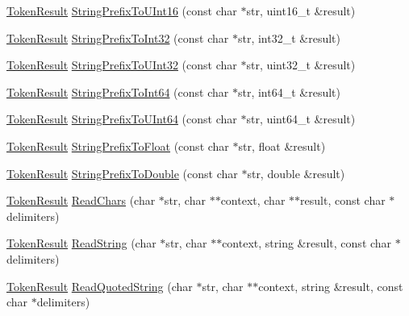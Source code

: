 \begin{DoxyCompactItemize}
\item 
\hyperlink{namespacemage_a2178ba2411db5912f41b2e7698c2037d}{Token\+Result} \hyperlink{namespacemage_a59f623733dd4ad636de4cea46467da7d}{String\+Prefix\+To\+U\+Int16} (const char $\ast$str, uint16\+\_\+t \&result)
\item 
\hyperlink{namespacemage_a2178ba2411db5912f41b2e7698c2037d}{Token\+Result} \hyperlink{namespacemage_a6fbea19380a6886e4e84f45d86d3379f}{String\+Prefix\+To\+Int32} (const char $\ast$str, int32\+\_\+t \&result)
\item 
\hyperlink{namespacemage_a2178ba2411db5912f41b2e7698c2037d}{Token\+Result} \hyperlink{namespacemage_a7843190a71ad080e1ae5e5f1ca518db9}{String\+Prefix\+To\+U\+Int32} (const char $\ast$str, uint32\+\_\+t \&result)
\item 
\hyperlink{namespacemage_a2178ba2411db5912f41b2e7698c2037d}{Token\+Result} \hyperlink{namespacemage_a8fda775d2c9f4f0a465d566540e91e82}{String\+Prefix\+To\+Int64} (const char $\ast$str, int64\+\_\+t \&result)
\item 
\hyperlink{namespacemage_a2178ba2411db5912f41b2e7698c2037d}{Token\+Result} \hyperlink{namespacemage_ae0ffd357b75c2e9321dcf44c00f1b607}{String\+Prefix\+To\+U\+Int64} (const char $\ast$str, uint64\+\_\+t \&result)
\item 
\hyperlink{namespacemage_a2178ba2411db5912f41b2e7698c2037d}{Token\+Result} \hyperlink{namespacemage_a760872d7402dea494afc7e402c7b38da}{String\+Prefix\+To\+Float} (const char $\ast$str, float \&result)
\item 
\hyperlink{namespacemage_a2178ba2411db5912f41b2e7698c2037d}{Token\+Result} \hyperlink{namespacemage_a289525f635f3921024dd10dd6073a555}{String\+Prefix\+To\+Double} (const char $\ast$str, double \&result)
\item 
\hyperlink{namespacemage_a2178ba2411db5912f41b2e7698c2037d}{Token\+Result} \hyperlink{namespacemage_a5f2717cd5b7cfa9a43396e628e18a5d0}{Read\+Chars} (char $\ast$str, char $\ast$$\ast$context, char $\ast$$\ast$result, const char $\ast$delimiters)
\item 
\hyperlink{namespacemage_a2178ba2411db5912f41b2e7698c2037d}{Token\+Result} \hyperlink{namespacemage_aa4f9ae6b6aa815ab879d4ea1f0453172}{Read\+String} (char $\ast$str, char $\ast$$\ast$context, string \&result, const char $\ast$delimiters)
\item 
\hyperlink{namespacemage_a2178ba2411db5912f41b2e7698c2037d}{Token\+Result} \hyperlink{namespacemage_a0d98db3ab52b137bc811727c68659329}{Read\+Quoted\+String} (char $\ast$str, char $\ast$$\ast$context, string \&result, const char $\ast$delimiters)

\end{DoxyCompactItemize}
